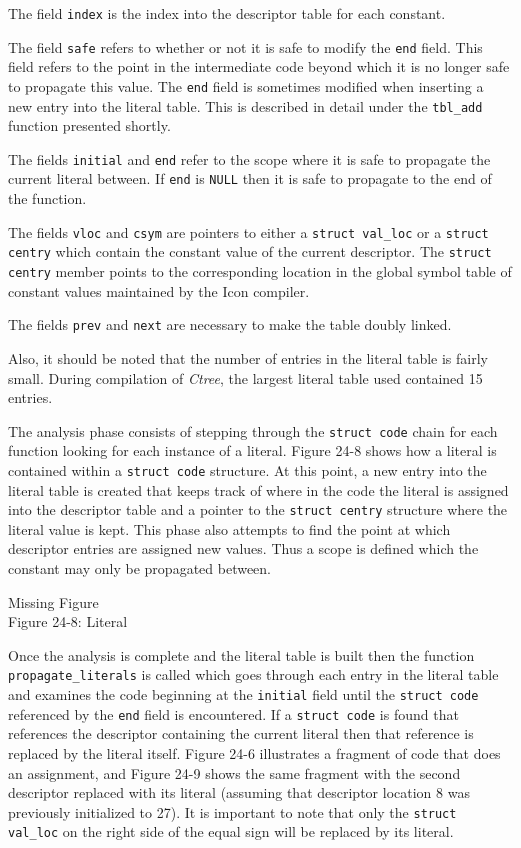 The field \texttt{index} is the index into the descriptor table for
each constant.


The field \texttt{safe} refers to whether or not it is safe to modify
the \texttt{end} field. This field refers to the point in the
intermediate code beyond which it is no longer safe to propagate this
value. The \texttt{end} field is sometimes modified when inserting a
new entry into the literal table. This is described in detail under
the \texttt{tbl\_add} function presented shortly.


The fields \texttt{initial} and \texttt{end} refer to the scope where
it is safe to propagate the current literal between. If \texttt{end}
is \texttt{NULL} then it is safe to propagate to the end of the
function.


The fields \texttt{vloc} and \texttt{csym} are pointers to either a
\texttt{struct val\_loc} or a \texttt{struct centry} which contain the
constant value of the current descriptor. The \texttt{struct centry}
member points to the corresponding location in the global symbol table
of constant values maintained by the Icon compiler.

The fields \texttt{prev} and \texttt{next} are necessary to make the
table doubly linked.

Also, it should be noted that the number of entries in the literal
table is fairly small. During compilation of \textit{Ctree}, the
largest literal table used contained 15 entries.

The analysis phase consists of stepping through the \texttt{struct
code} chain for each function looking for each instance of a
literal. Figure 24-8 shows how a literal is contained within a
\texttt{struct code} structure. At this point, a new entry into the
literal table is created that keeps track of where in the code the
literal is assigned into the descriptor table and a pointer to the
\texttt{struct centry} structure where the literal value is kept.
This phase also attempts to find the point at which descriptor entries
are assigned new values. Thus a scope is defined which the constant
may only be propagated between.


\bigskip

{\centering{}
  {\color{red}Missing Figure}\\
Figure 24-8: Literal
\par}


Once the analysis is complete and the literal table is built then the
function \texttt{propagate\_literals} is called which goes through
each entry in the literal table and examines the code beginning at the
\texttt{initial} field until the \texttt{struct code} referenced by
the \texttt{end} field is encountered. If a \texttt{struct code} is
found that references the descriptor containing the current literal
then that reference is replaced by the literal itself. Figure 24-6
illustrates a fragment of code that does an assignment, and Figure
24-9 shows the same fragment with the second descriptor replaced with
its literal (assuming that descriptor location 8 was previously
initialized to 27). It is important to note that only the
\texttt{struct val\_loc} on the right side of the equal sign will be
replaced by its literal.


